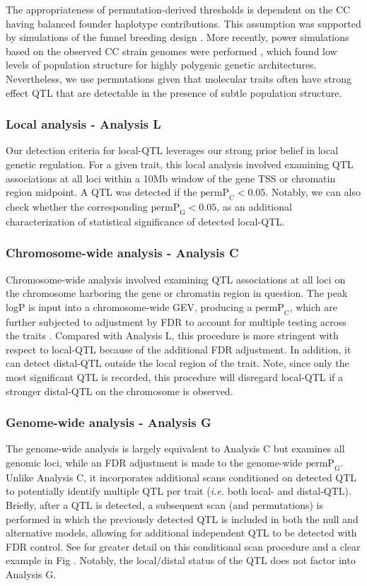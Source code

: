 \documentclass[10pt,letterpaper]{article}
\newcommand{\ie}{\emph{i.e.}\xspace}
\newcommand{\permpc}{\text{permP}_{\text{C}}}
\newcommand{\permpg}{\text{permP}_{\text{G}}}
\begin{document}
The appropriateness of permutation-derived thresholds \cite{Doerge1996} is dependent on the CC having balanced founder haplotype contributions. This assumption was supported by simulations of the funnel breeding design \cite{Valdar2006c}. More recently, power simulations based on the observed CC strain genomes were performed \cite{Keele2019}, which found low levels of population structure for highly polygenic genetic architectures. Nevertheless, we use permutations given that molecular traits often have strong effect QTL that are detectable in the presence of subtle population structure.

\subsubsection*{Local analysis - Analysis L} 
Our detection criteria for local-QTL leverages our strong prior belief in local genetic regulation. For a given trait, this local analysis involved examining QTL associations at all loci within a 10Mb window of the gene TSS or chromatin region midpoint. A QTL was detected if the $\text{permP}_{\text{C}} < 0.05$. Notably, we can also check whether the corresponding $\text{permP}_{\text{G}} < 0.05$, as an additional characterization of statistical significance of detected local-QTL.

\subsubsection*{Chromosome-wide analysis - Analysis C} 
Chromosome-wide analysis involved examining QTL associations at all loci on the chromosome harboring the gene or chromatin region in question. The peak logP is input into a chromosome-wide GEV, producing a $\permpc$, which are further subjected to adjustment by FDR to account for multiple testing across the traits \cite{Chesler2005}. 
Compared with Analysis L, this procedure is more stringent with respect to local-QTL because of the additional FDR adjustment. In addition, it can detect distal-QTL outside the local region of the trait. 
Note, since only the most significant QTL is recorded, this procedure will disregard local-QTL if a stronger distal-QTL on the chromosome is observed.

\subsubsection*{Genome-wide analysis - Analysis G} 
The genome-wide analysis is largely equivalent to Analysis C but examines all genomic loci, while an FDR adjustment is made to the genome-wide $\permpg$. Unlike Analysis C, it incorporates additional scans conditioned on detected QTL to potentially identify multiple QTL per trait (\ie both local- and distal-QTL). Briefly, after a QTL is detected, a subsequent scan (and permutations) is performed in which the previously detected QTL is included in both the null and alternative models, allowing for additional independent QTL to be detected with FDR control. See  for greater detail on this conditional scan procedure and a clear example in Fig . Notably, the local/distal status of the QTL does not factor into Analysis G.
\end{document}
